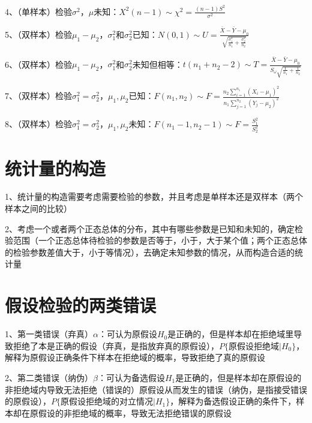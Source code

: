 4、（单样本）检验$\sigma^{2}$，$\mu$未知：$X^2(n-1) \sim \chi^{2}=\frac{(n-1) S^{2}}{\sigma^{2}}$

5、（双样本）检验$\mu_1-\mu_2$，$\sigma_{1}^{2}$和$\sigma_{2}^{2}$已知：$N(0,1) \sim U=\frac{\bar{X}-\bar{Y}-\mu_{0}}{\sqrt{\frac{\sigma_{1}^{2}}{n_{1}}+\frac{\sigma_{2}^{2}}{n_{2}}}}$

6、（双样本）检验$\mu_1-\mu_2$，$\sigma_{1}^{2}$和$\sigma_{2}^{2}$未知但相等：$t(n_1+n_2-2) \sim T=\frac{\bar{X}-\bar{Y}-\mu_{0}}{S_{\omega} \sqrt{\frac{1}{n_{1}}+\frac{1}{n_{2}}}}$

7、（双样本）检验$\sigma_{1}^{2} = \sigma_{2}^{2}$，$\mu_1,\mu_2$已知：$F(n_1,n_2) \sim F=\frac{n_{2} \sum_{i=1}^{n_{1}}\left(X_{i}-\mu_{1}\right)^{2}}{n_{1} \sum_{j=1}^{n_{2}}\left(Y_{j}-\mu_{2}\right)^{2}}$

8、（双样本）检验$\sigma_{1}^{2} = \sigma_{2}^{2}$，$\mu_1,\mu_2$未知：$F(n_1-1,n_2-1) \sim F=\frac{S_{1}^{2}}{S_{2}^{2}}$

\section{统计量的构造}

1、统计量的构造需要考虑需要检验的参数，并且考虑是单样本还是双样本（两个样本之间的比较）

2、考虑一个或者两个正态总体的分布，其中有哪些参数是已知和未知的，确定检验范围（一个正态总体待检验的参数是否等于，小于，大于某个值；两个正态总体的检验参数差值大于，小于等情况），去确定未知参数的情况，从而构造合适的统计量

\section{假设检验的两类错误}

1、第一类错误（弃真）$\alpha$：可认为原假设$H_0$是正确的，但是样本却在拒绝域里导致拒绝了本是正确的假设（弃真，是指放弃真的原假设），$P\{ 原假设拒绝域| H_0 \}$，解释为原假设正确条件下样本在拒绝域的概率，导致拒绝了真的原假设

2、第二类错误（纳伪）$\beta$：可认为备选假设$H_1$是正确的，但是样本却在原假设的非拒绝域内导致无法拒绝（错误的）原假设从而发生的错误（纳伪，是指接受错误的原假设），$P\{ 原假设拒绝域的对立情况| H_1 \}$，解释为备选假设正确的条件下，样本却在原假设的非拒绝域的概率，导致无法拒绝错误的原假设


